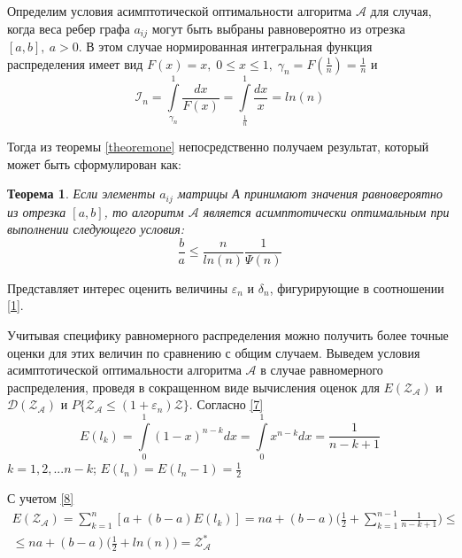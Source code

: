 \documentclass[a4paper, 14pt]{extarticle}
\numberwithin{equation}{section}
\newtheorem{theorem}{Теорема}[section]
\begin{document}
Определим условия асимптотической оптимальности алгоритма $\mathcal{A}$ для случая, когда веса ребер графа $a_{ij}$ могут быть выбраны равновероятно из отрезка $[a,b],\:  a>0$. В этом случае нормированная интегральная функция распределения имеет вид $F(x) = x,\; 0 \leqslant x \leqslant 1,\; \gamma_n = F(\frac{1}{n}) = \frac{1}{n}$ и
\begin{equation*}
\mathcal{I}_n = \int\limits_{\gamma_n}^1 \frac{dx}{F(x)} = \int\limits_{\frac{1}{n}}^1 \frac{dx}{x} = ln(n)
\end{equation*}

Тогда из теоремы \ref{theoremone} непосредственно получаем результат, который может быть сформулирован как:\\

\begin{theorem}
\label{theoremtwo}
Если элементы $a_{ij}$ матрицы А принимают значения равновероятно из отрезка $[a,b]$, то алгоритм $\mathcal{A}$ является асимптотически оптимальным при выполнении следующего условия:
\begin{equation*}
\frac{b}{a} \leqslant \frac{n}{ln(n)}\frac{1}{\Psi(n)}
\end{equation*}

\end{theorem}

Представляет интерес оценить величины $\varepsilon_n$ и $\delta_n$, фигурирующие в соотношении \eqref{1}.

Учитывая специфику равномерного распределения можно получить более точные оценки для этих величин по сравнению с общим случаем. Выведем условия асимптотической оптимальности алгоритма $\mathcal{A}$ в случае равномерного распределения, проведя в сокращенном виде вычисления оценок для $E(\mathcal{Z_{A}})$ и $\mathcal{D(Z_{A})}$ и $P \{ \mathcal{Z_{A}} \leqslant (1+\varepsilon_n)\mathcal{Z} \}$. Согласно \eqref{7}
\begin{equation}\label{eq13} 
E(l_k) = \int\limits_0^1 (1-x)^{n-k}dx = \int\limits_0^1 x^{n-k}dx = \frac{1}{n-k+1}
\end{equation}
$k=1,2,...n-k$;   $ E(l_n) = E(l_n-1) = \frac{1}{2}$

С учетом \eqref{8}
\begin{equation*}
\begin{aligned}
E(\mathcal{Z_{A}}) = \sum_{k=1}^{n} [a+(b-a)E(l_k)] = na +(b-a)\Big(\frac{1}{2}+\sum_{k=1}^{n-1} \frac{1}{n-k+1} \Big) \leqslant \\
\leqslant na+(b-a) \Big(\frac{1}{2} + ln(n) \Big) = \mathcal{Z^*_{A}}
\end{aligned}
\end{equation*}
\end{document}
